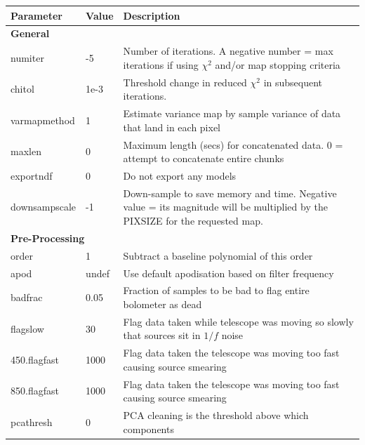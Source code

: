 \documentclass[twoside,11pt]{article}
\renewcommand{\_}{\texttt{\symbol{95}}}
\begin{document}
\begin{htmlonly}
\begin{table}
\begin{center}
\begin{footnotesize}
\begin{tabular}{|p{2.2cm}|p{1.1cm}|p{11.4cm}|}
\hline
Parameter & Value & Description \\
\hline
\multicolumn{3}{|l|}{\textbf{General}}\\
\hline
numiter       &   -5 & Number of iterations. A negative number = max iterations
                       if using $\chi^2$ and/or map stopping criteria\\
chitol        & 1e-3 & Threshold change in reduced $\chi^2$ in subsequent
                       iterations.\\
varmapmethod  &    1 & Estimate variance map by sample variance of data that
                       land in each pixel\\
maxlen        &    0 & Maximum length (secs) for concatenated data. 0 = attempt
                       to concatenate entire chunks\\
exportndf     &    0 & Do not export any models\\
downsampscale &   -1 & Down-sample to save memory and time. Negative value = its
                       magnitude will be multiplied by the PIXSIZE for the
                       requested map.\\
\hline
\multicolumn{3}{|l|}{\textbf{Pre-Processing}}\\
\hline
order         &    1  & Subtract a baseline polynomial of this order\\
apod          & undef & Use default apodisation based on filter frequency\\
badfrac       & 0.05  & Fraction of samples to be bad to flag entire bolometer
                        as dead\\
flagslow      &    30 & Flag data taken while telescope was moving so slowly
                        that sources sit in $1/f$ noise\\
450.flagfast  &  1000 & Flag data taken the telescope was moving too fast
                        causing source smearing}\\
850.flagfast  &  1000 & Flag data taken the telescope was moving too fast
                        causing source smearing}\\
pcathresh     &     0 & PCA cleaning is the threshold above which components

\end{tabular}
\end{footnotesize}
\end{center}
\end{table}
\end{htmlonly}
\end{document}
